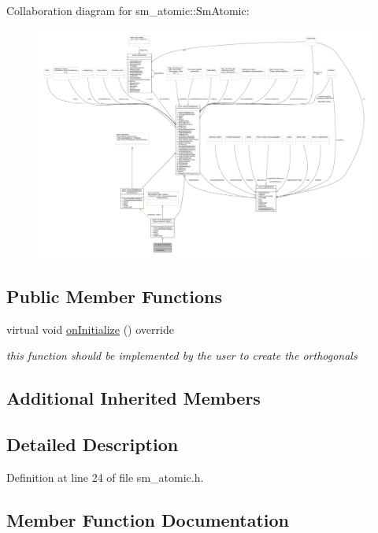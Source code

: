 Collaboration diagram for sm\+\_\+atomic\+:\+:Sm\+Atomic\+:\nopagebreak
\begin{figure}[H]
\begin{center}
\leavevmode
\includegraphics[width=350pt]{structsm__atomic_1_1SmAtomic__coll__graph}
\end{center}
\end{figure}
\subsection*{Public Member Functions}
\begin{DoxyCompactItemize}
\item 
virtual void \hyperlink{structsm__atomic_1_1SmAtomic_ac87a3d5a78eb48b949b3948f9ce28d24}{on\+Initialize} () override
\begin{DoxyCompactList}\small\item\em this function should be implemented by the user to create the orthogonals \end{DoxyCompactList}\end{DoxyCompactItemize}
\subsection*{Additional Inherited Members}


\subsection{Detailed Description}


Definition at line 24 of file sm\+\_\+atomic.\+h.



\subsection{Member Function Documentation}
